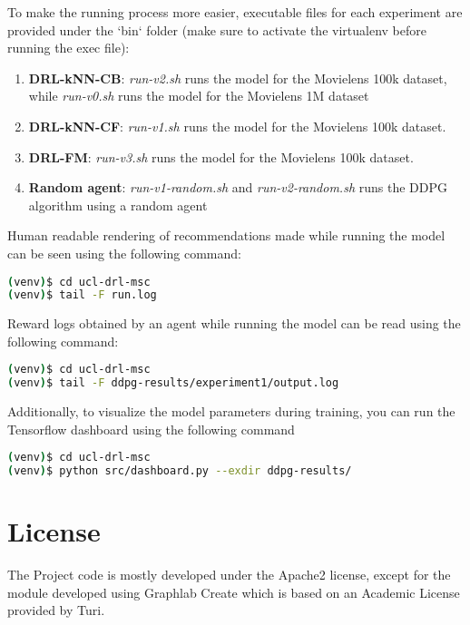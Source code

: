 To make the running process more easier, executable files for each experiment are provided under the `bin` folder (make sure to activate the virtualenv before running the exec file):

\begin{enumerate}
\item \textbf{DRL-kNN-CB}: \textit{run-v2.sh} runs the model for the Movielens 100k dataset, while \textit{run-v0.sh} runs the model for the Movielens 1M dataset
\item \textbf{DRL-kNN-CF}: \textit{run-v1.sh} runs the model for the Movielens 100k dataset.
\item \textbf{DRL-FM}: \textit{run-v3.sh} runs the model for the Movielens 100k dataset.
\item \textbf{Random agent}: \textit{run-v1-random.sh} and \textit{run-v2-random.sh} runs the DDPG algorithm using a random agent
\end{enumerate}

Human readable rendering of recommendations made while running the model can be seen using the following command:

\begin{lstlisting}[language=bash]
(venv)$ cd ucl-drl-msc
(venv)$ tail -F run.log
\end{lstlisting}

Reward logs obtained by an agent while running the model can be read using the following command:

\begin{lstlisting}[language=bash]
(venv)$ cd ucl-drl-msc
(venv)$ tail -F ddpg-results/experiment1/output.log
\end{lstlisting}

Additionally, to visualize the model parameters during training, you can run the Tensorflow dashboard using the following command

\begin{lstlisting}[language=bash]
(venv)$ cd ucl-drl-msc
(venv)$ python src/dashboard.py --exdir ddpg-results/
\end{lstlisting}

\section{License}

The Project code is mostly developed under the Apache2 license, except for the module developed using Graphlab Create which is based on an Academic License provided by Turi.

